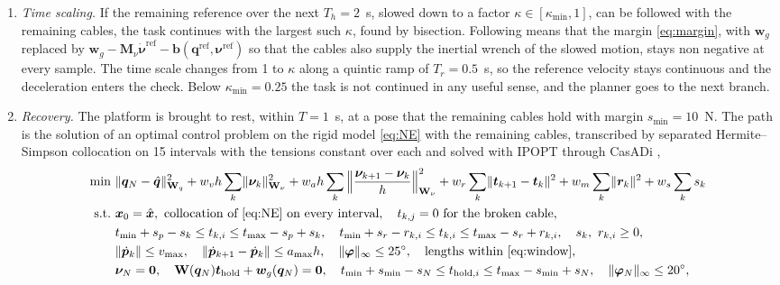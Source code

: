 \documentclass[10pt]{article}
\newcommand{\vc}[1]{\bm{#1}}
\newcommand{\mt}[1]{\mathbf{#1}}
\begin{document}
\begin{enumerate}
\item \emph{Time scaling.} If the remaining reference over the next $T_h=2$~s, slowed down to a factor $\kappa\in[\kappa_{\min},1]$, can be followed with the remaining cables, the task continues with the largest such $\kappa$, found by bisection. Following means that the margin \eqref{eq:margin}, with $\vc w_g$ replaced by $\vc w_g-\mt M_\nu\dot{\vc\nu}^{\mathrm{ref}}-\vc b(\vc q^{\mathrm{ref}},\vc\nu^{\mathrm{ref}})$ so that the cables also supply the inertial wrench of the slowed motion, stays non negative at every sample. The time scale changes from 1 to $\kappa$ along a quintic ramp of $T_r=0.5$~s, so the reference velocity stays continuous and the deceleration enters the check. Below $\kappa_{\min}=0.25$ the task is not continued in any useful sense, and the planner goes to the next branch.
\item \emph{Recovery.} The platform is brought to rest, within $T=1$~s, at a pose that the remaining cables hold with margin $s_{\min}=10$~N. The path is the solution of an optimal control problem on the rigid model \eqref{eq:NE} with the remaining cables, transcribed by separated Hermite--Simpson collocation \citep{kelly2017collocation} on 15 intervals with the tensions constant over each and solved with IPOPT \citep{wachter2006ipopt} through CasADi \citep{andersson2019casadi},
\begin{equation}\label{eq:recovery}
\begin{aligned}
\min\ & \lVert\vc q_N-\hat{\vc q}\rVert^2_{\mt W_q}+w_v h\sum_k\lVert\vc\nu_k\rVert^2_{\mt W_\nu}+w_a h\sum_k\Big\lVert\frac{\vc\nu_{k+1}-\vc\nu_k}{h}\Big\rVert^2_{\mt W_\nu}+w_r\sum_k\lVert\vc t_{k+1}-\vc t_k\rVert^2+w_m\sum_k\lVert\vc r_k\rVert^2+w_s\sum_k s_k\\
\text{s.t.}\ & \vc x_0=\hat{\vc x},\ \text{collocation of \eqref{eq:NE} on every interval},\quad t_{k,j}=0\ \text{for the broken cable},\\
& t_{\min}+s_p-s_k\le t_{k,i}\le t_{\max}-s_p+s_k,\quad t_{\min}+s_r-r_{k,i}\le t_{k,i}\le t_{\max}-s_r+r_{k,i},\quad s_k,\ r_{k,i}\ge0,\\
& \lVert\dot{\vc p}_k\rVert\le v_{\max},\quad\lVert\dot{\vc p}_{k+1}-\dot{\vc p}_k\rVert\le a_{\max}h,\quad\lVert\vc\varphi\rVert_\infty\le25^\circ,\quad\text{lengths within \eqref{eq:window}},\\
& \vc\nu_N=\vc 0,\quad \mt W(\vc q_N)\vc t_{\mathrm{hold}}+\vc w_g(\vc q_N)=\vc 0,\quad t_{\min}+s_{\min}-s_N\le t_{\mathrm{hold},i}\le t_{\max}-s_{\min}+s_N,\quad\lVert\vc\varphi_N\rVert_\infty\le20^\circ,

\end{aligned}
\end{equation}
\end{enumerate}
\end{document}
